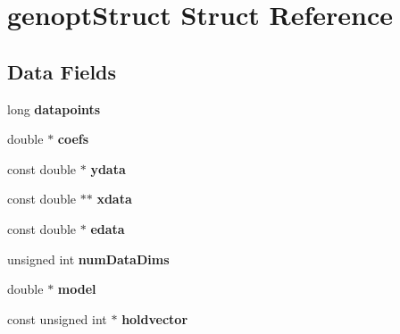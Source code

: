 \hypertarget{structgenopt_struct}{
\section{genoptStruct Struct Reference}
\label{structgenopt_struct}
}
\subsection*{Data Fields}
\begin{DoxyCompactItemize}
\item 
\hypertarget{structgenopt_struct_a88997587f04f01c7c69066e78d74357d}{
long {\bfseries datapoints}}
\label{structgenopt_struct_a88997587f04f01c7c69066e78d74357d}

\item 
\hypertarget{structgenopt_struct_a348a4cb44d321d23912ab7d18bb0d8b0}{
double $\ast$ {\bfseries coefs}}
\label{structgenopt_struct_a348a4cb44d321d23912ab7d18bb0d8b0}

\item 
\hypertarget{structgenopt_struct_a3e1f678bd5d870b95643f11bb151efe8}{
const double $\ast$ {\bfseries ydata}}
\label{structgenopt_struct_a3e1f678bd5d870b95643f11bb151efe8}

\item 
\hypertarget{structgenopt_struct_ad1d9f282c583f4bfe7471643c1962f99}{
const double $\ast$$\ast$ {\bfseries xdata}}
\label{structgenopt_struct_ad1d9f282c583f4bfe7471643c1962f99}

\item 
\hypertarget{structgenopt_struct_a85cbaf49494b9aaacd5329df2b2f1a82}{
const double $\ast$ {\bfseries edata}}
\label{structgenopt_struct_a85cbaf49494b9aaacd5329df2b2f1a82}

\item 
\hypertarget{structgenopt_struct_a990a619baa68656ebaa6d8a438ce23aa}{
unsigned int {\bfseries numDataDims}}
\label{structgenopt_struct_a990a619baa68656ebaa6d8a438ce23aa}

\item 
\hypertarget{structgenopt_struct_a0bfecaf88c0de77fcf25776afdb72c79}{
double $\ast$ {\bfseries model}}
\label{structgenopt_struct_a0bfecaf88c0de77fcf25776afdb72c79}

\item 
\hypertarget{structgenopt_struct_a2549fc53c928164dfbf89e833ff7962a}{
const unsigned int $\ast$ {\bfseries holdvector}}
\label{structgenopt_struct_a2549fc53c928164dfbf89e833ff7962a}


\end{DoxyCompactItemize}
